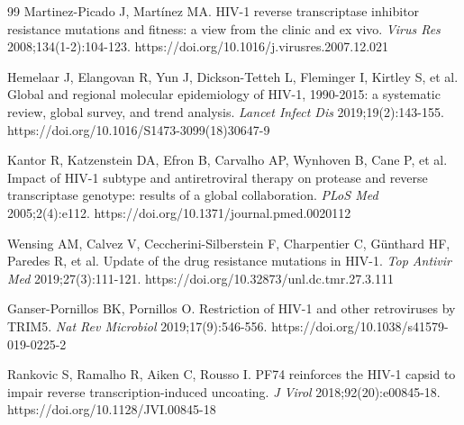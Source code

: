 \documentclass[preprint]{elsarticle}
\begin{document}
\begin{thebibliography}{99}
 Martinez-Picado J, Martínez MA. HIV-1 reverse transcriptase inhibitor resistance mutations and fitness: a view from the clinic and ex vivo. \textit{Virus Res} 2008;134(1-2):104-123. https://doi.org/10.1016/j.virusres.2007.12.021

 Hemelaar J, Elangovan R, Yun J, Dickson-Tetteh L, Fleminger I, Kirtley S, et al. Global and regional molecular epidemiology of HIV-1, 1990-2015: a systematic review, global survey, and trend analysis. \textit{Lancet Infect Dis} 2019;19(2):143-155. https://doi.org/10.1016/S1473-3099(18)30647-9

 Kantor R, Katzenstein DA, Efron B, Carvalho AP, Wynhoven B, Cane P, et al. Impact of HIV-1 subtype and antiretroviral therapy on protease and reverse transcriptase genotype: results of a global collaboration. \textit{PLoS Med} 2005;2(4):e112. https://doi.org/10.1371/journal.pmed.0020112

 Wensing AM, Calvez V, Ceccherini-Silberstein F, Charpentier C, Günthard HF, Paredes R, et al. Update of the drug resistance mutations in HIV-1. \textit{Top Antivir Med} 2019;27(3):111-121. https://doi.org/10.32873/unl.dc.tmr.27.3.111

 Ganser-Pornillos BK, Pornillos O. Restriction of HIV-1 and other retroviruses by TRIM5. \textit{Nat Rev Microbiol} 2019;17(9):546-556. https://doi.org/10.1038/s41579-019-0225-2

 Rankovic S, Ramalho R, Aiken C, Rousso I. PF74 reinforces the HIV-1 capsid to impair reverse transcription-induced uncoating. \textit{J Virol} 2018;92(20):e00845-18. https://doi.org/10.1128/JVI.00845-18

\end{thebibliography}
\end{document}
